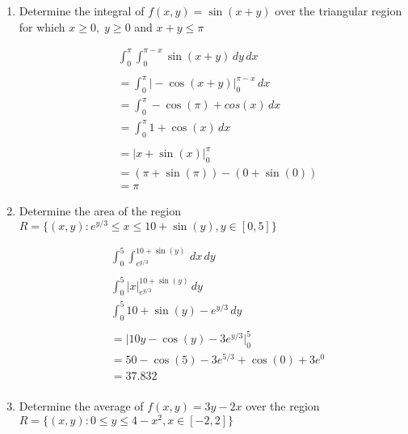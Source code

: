 \documentclass[a4paper,11pt]{article}
\begin{document}
\begin{preview}
\begin{enumerate}
\begin{enumerate}
        \item Determine the integral of $f(x,y)=\sin(x+y)$ over the triangular region for which $ x \geq 0, \; y \geq 0 $ and $ x+y \leq \pi $
        
        \begin{align*}
            &\int_{0}^{\pi} \int_{0}^{\pi - x} \sin(x+y) \,dy  \,dx \\\\
            &= \int_{0}^{\pi} \Big|-\cos(x+y) \Big|_{0}^{\pi - x}  \,dx \\
            &= \int_{0}^{\pi} -\cos(\pi) + cos(x) \,dx \\
            &= \int_{0}^{\pi} 1 + \cos(x) \,dx \\\\
            &= \Big| x +\sin(x) \Big|_{0}^{\pi} \\
            &= (\pi + \sin(\pi)) - (0 +\sin(0)) \\
            &= \pi
        \end{align*}

        \item Determine the area of the region $R = \{(x,y) : e^{y/3} \leq x \leq 10+\sin(y), y \in [0,5]\}$ 
        
        \begin{align*}
            &\int_{0}^{5} \int_{e^{y/3}}^{10+\sin(y)} \,dx  \,dy \\\\
            &\int_{0}^{5} \Big| x  \Big|_{e^{y/3}}^{10+\sin(y)} \,dy \\
            &\int_{0}^{5}  10+\sin(y) - e^{y/3} \,dy \\\\
            &= \Big| 10y -\cos(y) - 3e^{y/3} \Big|_{0}^{5} \\
            &= 50 -\cos(5) - 3e^{5/3} + \cos(0) + 3e^{0} \\
            &= 37.832 \\
        \end{align*}

        \item Determine the average of $f(x,y) = 3y-2x$ over the region \\$R = \{ (x,y) : 0 \leq y \leq 4-x^2, x \in [-2,2] \}$
        

\end{enumerate}
\end{enumerate}
\end{preview}
\end{document}
